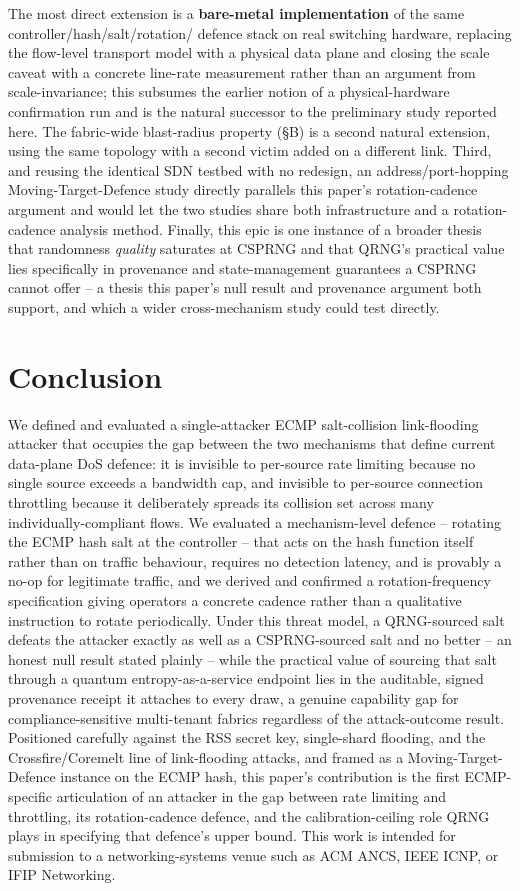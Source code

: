 \documentclass[conference]{IEEEtran}
\begin{document}
The most direct extension is a \textbf{bare-metal implementation} of the same controller/hash/salt/rotation/
defence stack on real switching hardware, replacing the flow-level transport model with a physical data plane
and closing the scale caveat with a concrete line-rate measurement rather than an argument from
scale-invariance; this subsumes the earlier notion of a physical-hardware confirmation run and is the natural
successor to the preliminary study reported here. The fabric-wide blast-radius property (\S B) is a second
natural extension, using the same topology with a second victim added on a different link. Third, and reusing the identical SDN testbed with no redesign, an
address/port-hopping Moving-Target-Defence study directly parallels this paper's rotation-cadence argument and
would let the two studies share both infrastructure and a rotation-cadence analysis method. Finally, this
epic is one instance of a broader thesis that randomness \emph{quality} saturates at CSPRNG and that QRNG's
practical value lies specifically in provenance and state-management guarantees a CSPRNG cannot offer -- a
thesis this paper's null result and provenance argument both support, and which a wider cross-mechanism study
could test directly.

\section{Conclusion}

We defined and evaluated a single-attacker ECMP salt-collision link-flooding attacker that occupies the gap
between the two mechanisms that define current data-plane DoS defence: it is invisible to per-source rate
limiting because no single source exceeds a bandwidth cap, and invisible to per-source connection throttling
because it deliberately spreads its collision set across many individually-compliant flows. We evaluated a
mechanism-level defence -- rotating the ECMP hash salt at the controller -- that acts on the hash function
itself rather than on traffic behaviour, requires no detection latency, and is provably a no-op for legitimate
traffic, and we derived and confirmed a rotation-frequency specification giving operators a concrete cadence
rather than a qualitative instruction to rotate periodically. Under this threat model, a QRNG-sourced salt
defeats the attacker exactly as well as a CSPRNG-sourced salt and no better -- an honest null result stated
plainly -- while the practical value of sourcing that salt through a quantum entropy-as-a-service endpoint lies
in the auditable, signed provenance receipt it attaches to every draw, a genuine capability gap for
compliance-sensitive multi-tenant fabrics regardless of the attack-outcome result. Positioned carefully against
the RSS secret key, single-shard flooding, and the Crossfire/Coremelt line of link-flooding attacks, and framed
as a Moving-Target-Defence instance on the ECMP hash, this paper's contribution is the first ECMP-specific
articulation of an attacker in the gap between rate limiting and throttling, its rotation-cadence defence, and
the calibration-ceiling role QRNG plays in specifying that defence's upper bound. This work is intended for
submission to a networking-systems venue such as ACM ANCS, IEEE ICNP, or IFIP Networking.
\end{document}
